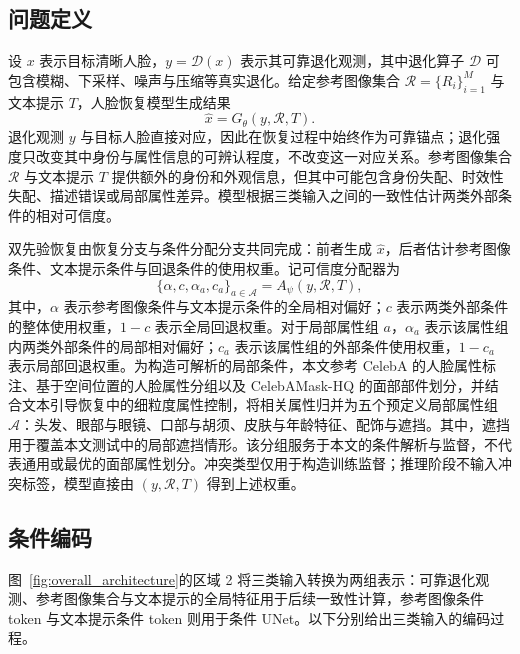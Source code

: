\documentclass[journal]{IEEEtran}
\begin{document}
\subsection{问题定义}
设 $x$ 表示目标清晰人脸，$y=\mathcal{D}(x)$ 表示其可靠退化观测，其中退化算子 $\mathcal{D}$ 可包含模糊、下采样、噪声与压缩等真实退化\cite{wang2021gfpgan,wang2023dr2}。给定参考图像集合 $\mathcal{R}=\{R_i\}_{i=1}^{M}$ 与文本提示 $T$，人脸恢复模型生成结果
\begin{equation}
\label{eq:problem_restore}
\hat{x}=G_{\theta}(y,\mathcal{R},T).
\end{equation}
退化观测 $y$ 与目标人脸直接对应，因此在恢复过程中始终作为可靠锚点；退化强度只改变其中身份与属性信息的可辨认程度，不改变这一对应关系。参考图像集合 $\mathcal{R}$ 与文本提示 $T$ 提供额外的身份和外观信息，但其中可能包含身份失配、时效性失配、描述错误或局部属性差异。模型根据三类输入之间的一致性估计两类外部条件的相对可信度。

双先验恢复由恢复分支与条件分配分支共同完成：前者生成 $\hat{x}$，后者估计参考图像条件、文本提示条件与回退条件的使用权重。记可信度分配器为
\begin{equation}
\label{eq:problem_allocator}
\{\alpha,c,\alpha_a,c_a\}_{a\in\mathcal{A}}
=A_{\psi}(y,\mathcal{R},T),
\end{equation}
其中，$\alpha$ 表示参考图像条件与文本提示条件的全局相对偏好；$c$ 表示两类外部条件的整体使用权重，$1-c$ 表示全局回退权重。对于局部属性组 $a$，$\alpha_a$ 表示该属性组内两类外部条件的局部相对偏好；$c_a$ 表示该属性组的外部条件使用权重，$1-c_a$ 表示局部回退权重。为构造可解析的局部条件，本文参考 CelebA 的人脸属性标注、基于空间位置的人脸属性分组以及 CelebAMask-HQ 的面部部件划分\cite{liu2015faceattributes,cao2018psmcnn,lee2020maskgan}，并结合文本引导恢复中的细粒度属性控制\cite{tao2025mgfr,zhu2026a2bfr}，将相关属性归并为五个预定义局部属性组 $\mathcal{A}$：头发、眼部与眼镜、口部与胡须、皮肤与年龄特征、配饰与遮挡。其中，遮挡用于覆盖本文测试中的局部遮挡情形。该分组服务于本文的条件解析与监督，不代表通用或最优的面部属性划分。冲突类型仅用于构造训练监督；推理阶段不输入冲突标签，模型直接由 $(y,\mathcal{R},T)$ 得到上述权重。

\subsection{条件编码}
图~\ref{fig:overall_architecture}的区域 2 将三类输入转换为两组表示：可靠退化观测、参考图像集合与文本提示的全局特征用于后续一致性计算，参考图像条件 token 与文本提示条件 token 则用于条件 UNet。以下分别给出三类输入的编码过程。
\end{document}
